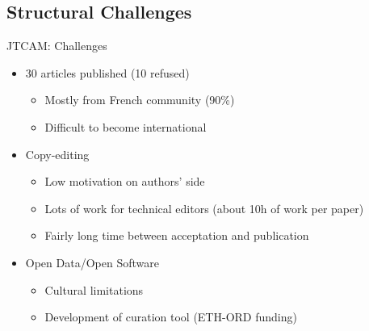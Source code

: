 \documentclass[10pt,compress,serif,aspectratio=169]{beamer}
\begin{document}
\subsection{Structural Challenges}

\begin{frame}[t]{JTCAM: Challenges}
  \begin{itemize}
  \item 30 articles published (10 refused)
    \begin{itemize}
    \item Mostly from French community (90\%)
    \item Difficult to become international
    \end{itemize}
  \item Copy-editing
    \begin{itemize}
    \item Low motivation on authors' side
    \item Lots of work for technical editors (about 10h of work per paper)
    \item Fairly long time between acceptation and publication 
    \end{itemize}
  \item Open Data/Open Software 
    \begin{itemize}
    \item Cultural limitations
    \item Development of curation tool (ETH-ORD funding)
    \end{itemize}

  \end{itemize}
\end{frame}

\end{document}
